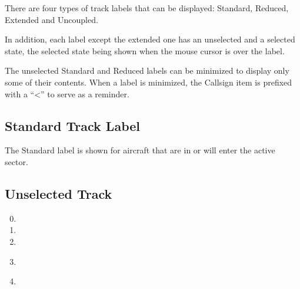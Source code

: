 \documentclass[a4paper,oneside,11pt]{memoir}
\begin{document}
There are four types of track labels that can be displayed: Standard, Reduced, Extended and Uncoupled.

In addition, each label except the extended one has an unselected and a selected state, the selected state being shown when the mouse cursor is over the label.

\bigskip

The unselected Standard and Reduced labels can be minimized to display only some of their contents. When a label is minimized, the Callsign item is prefixed with a “<” to serve as a reminder.

\subsection{Standard Track Label}
\label{tlabel:std}

The Standard label is shown for aircraft that are in or will enter the active sector.

\subsection*{Unselected Track}

\begin{enumerate}[label=Line \arabic*]
  \setcounter{enumi}{-1}
  \item {}                                
  \item {}      
  \item {}       
  \item {}  \      
  \item {}    
\end{enumerate}
\end{document}
